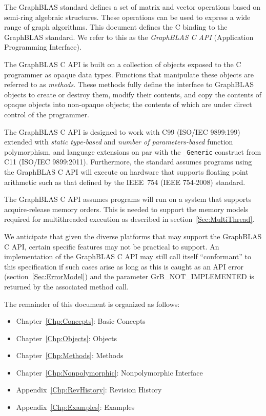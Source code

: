 \documentclass[11pt]{extbook}
\begin{document}
The GraphBLAS standard defines a set of matrix and vector operations 
%
based on semi-ring algebraic structures.  
These operations can be used
to express a wide range of graph algorithms.   This document 
defines the C binding to the GraphBLAS standard.   We refer to 
this as the {\it GraphBLAS C API} (Application Programming Interface).   

The GraphBLAS C API is built on a collection of   
objects exposed to the C programmer as opaque data types. 
Functions that manipulate these
objects are referred to as {\it methods}.  These methods fully define the 
interface to GraphBLAS objects to create or destroy them, modify their 
contents, and copy the contents of opaque objects into non-opaque objects; the 
contents of which are under direct control of the programmer.

The GraphBLAS C API is designed to work with C99 (ISO/IEC 9899:199) 
extended with {\it static type-based} and {\it number of parameters-based}
function polymorphism, and language extensions on par with 
the {\tt \_Generic} construct from C11 (ISO/IEC 9899:2011).  
Furthermore, the standard assumes programs using the GraphBLAS C API
will execute on hardware that supports floating point arithmetic
such as that defined by the IEEE~754 (IEEE 754-2008) standard. 

The GraphBLAS C API assumes programs will run on a system
that supports acquire-release memory orders.  This is needed to support
the memory models required for multithreaded execution as described in section~\ref{Sec:MultiThread}.

We anticipate that given the diverse platforms that may support the GraphBLAS C API, certain 
specific features may not be practical to support.  An implementation of the GraphBLAS C API
may still call itself ``conformant'' to this specification if such cases arise as long as this is
caught as an API error (section~\ref{Sec:ErrorModel}) and the parameter {\sf GrB\_NOT\_IMPLEMENTED}
is returned by the associated method call.

The remainder of this document is organized as follows:
\begin{itemize}
\item Chapter~\ref{Chp:Concepts}: Basic Concepts
\item Chapter~\ref{Chp:Objects}: Objects
\item Chapter~\ref{Chp:Methods}: Methods
\item Chapter~\ref{Chp:Nonpolymorphic}: Nonpolymorphic Interface
\item Appendix~\ref{Chp:RevHistory}: Revision History
\item Appendix~\ref{Chp:Examples}: Examples
\end{itemize}
\end{document}
